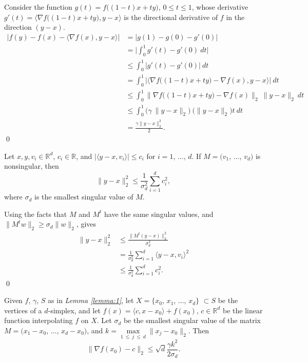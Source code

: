 \documentclass[smallextended,final]{svjour3}  %
\begin{document}
\begin{proofdot}
  Consider the function $g(t) = f \big((1-t) x + t y \big)$, $0 \leq t
  \leq 1$, whose derivative $g'(t) = \big\langle \nabla f \big((1-t) x
  + t y \big), y - x \big\rangle$ is the directional derivative of $f$
  in the direction $(y - x).$
  \begin{align*}
    \big|f(y) - f(x) - \langle \nabla f(x), y - x \rangle \big|
       &= \big|g(1) - g(0) - g'(0) \big| & \\
       &= \bigg| \int_0^1 g'(t) - g'(0)\ dt \bigg| \\
       &\leq \int_0^1 \big|g'(t) - g'(0)\big|\ dt \\
       &= \int_0^1 \bigg| \big \langle \nabla f\big((1-t)x + ty\big) - \nabla f(x), y - x \big \rangle \bigg|\ dt \\
       &\leq \int_0^1 \big \| \nabla f\big((1-t)x + ty\big) - \nabla f(x) \big \|_2\ \| y - x \|_2\ dt \\
       &\leq \int_0^1 \big ( \gamma\ \|y-x\|_2 \big) \ \big( \|y-x\|_2 \big) t\ dt \\
       &= \frac{\gamma \|y - x\|_2^2}{2}.
  \end{align*}
  \qed
\end{proofdot}

\begin{plainlemma}
  \label{lemma:2}
  Let $x, y, v_i \in \mathbb{R}^d$, $c_i \in \mathbb{R}$, and
  $|\langle y - x, v_i \rangle| \leq c_i$ for $i = 1$, $\ldots$, $d.$
  If $M = (v_1$, $\ldots$, $v_d)$ is nonsingular, then
  $$\|y - x\|_2^2 \leq \frac{1}{\sigma_d^2} \sum_{i=1}^d c_i^2,$$
  where $\sigma_d$ is the smallest singular value of $M.$
\end{plainlemma}

\begin{proofdot}
  Using the facts that $M$ and $M^t$ have the same singular values,
  and $\|M^tw\|_2 \geq \sigma_d \|w\|_2$, gives
  \begin{align*}
    \|y - x\|_2^2 &\leq \frac{\|M^t (y - x)\|_2^2}{\sigma_d^2} \\
                  &=    \frac{1}{\sigma_d^2} \sum_{i=1}^d \langle y - x, v_i \rangle^2 \\
                  &\leq \frac{1}{\sigma_d^2} \sum_{i=1}^d c_i^2.
  \end{align*}
  \qed
\end{proofdot}

\begin{plainlemma}
  \label{lemma:3}
  Given $f$, $\gamma$, $S$ as in {\it Lemma \ref{lemma:1}}, let $X =
  \{x_0$, $x_1$, $\ldots$, $x_d\}$ $\subset S$ be the vertices of a
  $d$-simplex, and let $\hat f(x) = \langle c, x - x_0 \rangle +
  f(x_0)$, $c \in \mathbb{R}^d$ be the linear function interpolating
  $f$ on $X.$ Let $\sigma_d$ be the smallest singular value of the
  matrix $M = (x_1 - x_0$, $\ldots$, $x_d - x_0)$, and $k =
  \max\limits_{1\ \leq\ j\ \leq\ d} \|x_j - x_0\|_2.$ Then
  $$\big\|\nabla f(x_0) - c\big\|_2 \leq \sqrt{d} \frac{\gamma k^2}{2 \sigma_d}.$$
\end{plainlemma}
\end{document}

